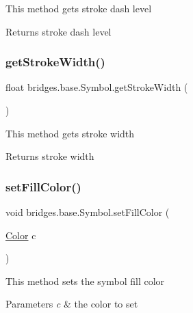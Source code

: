 This method gets stroke dash level

\begin{DoxyReturn}{Returns}
stroke dash level 
\end{DoxyReturn}
\mbox{\label{classbridges_1_1base_1_1_symbol_a9c79f84ba764b7683c99c5deb1f5a191}} 
\subsubsection{\texorpdfstring{getStrokeWidth()}{getStrokeWidth()}}
{\footnotesize\ttfamily float bridges.\+base.\+Symbol.\+get\+Stroke\+Width (\begin{DoxyParamCaption}{ }\end{DoxyParamCaption})}

This method gets stroke width

\begin{DoxyReturn}{Returns}
stroke width 
\end{DoxyReturn}
\mbox{\label{classbridges_1_1base_1_1_symbol_a850688e5157674aee916fef6cd9e0b8c}} 
\subsubsection{\texorpdfstring{setFillColor()}{setFillColor()}\hspace{0.1cm}{\footnotesize\ttfamily [1/2]}}
{\footnotesize\ttfamily void bridges.\+base.\+Symbol.\+set\+Fill\+Color (\begin{DoxyParamCaption}\item[{\mbox{\hyperlink{classbridges_1_1base_1_1_color}{Color}}}]{c }\end{DoxyParamCaption})}

This method sets the symbol fill color


\begin{DoxyParams}{Parameters}
{\em c} & the color to set \\
\hline
\end{DoxyParams}
\mbox{\label{classbridges_1_1base_1_1_symbol_a3a2c48d9707ff3fa7a832e77b679b1b9}} 
